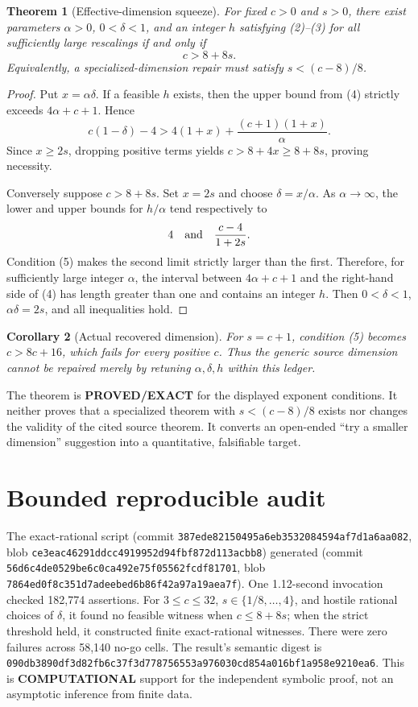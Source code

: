 \documentclass[11pt]{article}
\newtheorem{theorem}{Theorem}
\newtheorem{corollary}[theorem]{Corollary}
\newcommand{\EXACT}{\textbf{PROVED/EXACT}}
\newcommand{\COMP}{\textbf{COMPUTATIONAL}}
\begin{document}
\begin{theorem}[Effective-dimension squeeze]
For fixed \(c>0\) and \(s>0\), there exist parameters
\(\alpha>0\), \(0<\delta<1\), and an integer \(h\) satisfying (2)--(3)
for all sufficiently large rescalings if and only if
\[
                         c>8+8s.                          \tag{5}
\]
Equivalently, a specialized-dimension repair must satisfy
\(s<(c-8)/8\).
\end{theorem}
\begin{proof}
Put \(x=\alpha\delta\).  If a feasible \(h\) exists, then the upper bound
from (4) strictly exceeds \(4\alpha+c+1\).  Hence
\[
 c(1-\delta)-4
   >4(1+x)+\frac{(c+1)(1+x)}{\alpha}.
\]
Since \(x\ge2s\), dropping positive terms yields
\(c>8+4x\ge8+8s\), proving necessity.

Conversely suppose \(c>8+8s\).  Set \(x=2s\) and choose
\(\delta=x/\alpha\).  As \(\alpha\to\infty\), the lower and upper bounds
for \(h/\alpha\) tend respectively to
\[
             4 \quad\hbox{and}\quad \frac{c-4}{1+2s}.
\]
Condition (5) makes the second limit strictly larger than the first.
Therefore, for sufficiently large integer \(\alpha\), the interval between
\(4\alpha+c+1\) and the right-hand side of (4) has length greater than one
and contains an integer \(h\).  Then \(0<\delta<1\),
\(\alpha\delta=2s\), and all inequalities hold.
\end{proof}

\begin{corollary}[Actual recovered dimension]
For \(s=c+1\), condition (5) becomes \(c>8c+16\), which fails for every
positive \(c\).  Thus the generic source dimension cannot be repaired merely
by retuning \(\alpha,\delta,h\) within this ledger.
\end{corollary}

The theorem is \EXACT{} for the displayed exponent conditions.  It neither
proves that a specialized theorem with \(s<(c-8)/8\) exists nor changes the
validity of the cited source theorem.  It converts an open-ended ``try a
smaller dimension'' suggestion into a quantitative, falsifiable target.

\section{Bounded reproducible audit}
The exact-rational script
(commit \texttt{387ede82150495a6eb3532084594af7d1a6aa082}, blob
\texttt{ce3eac46291ddcc4919952d94fbf872d113acbb8}) generated
(commit \texttt{56d6c4de0529be6c0ca492e75f05562fcdf81701}, blob
\texttt{7864ed0f8c351d7adeebed6b86f42a97a19aea7f}).
One 1.12-second invocation checked 182,774 assertions.  For
\(3\le c\le32\), \(s\in\{1/8,\ldots,4\}\), and hostile rational choices of
\(\delta\), it found no feasible witness when \(c\le8+8s\); when the strict
threshold held, it constructed finite exact-rational witnesses.  There were
zero failures across 58,140 no-go cells.  The result's semantic digest is
\texttt{090db3890df3d82fb6c37f3d778756553a976030cd854a016bf1a958e9210ea6}.
This is \COMP{} support for the independent symbolic proof, not an
asymptotic inference from finite data.
\end{document}
